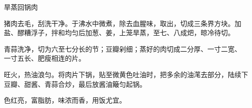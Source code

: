 %
%
%
%
%
%
%
\begin{recipe}{旱蒸回锅肉}

\ingredients


\preparation

\step 猪肉去毛，刮洗干净。于沸水中微煮，除去血腥味，取出，切成三条界方块。加
盐、醪糟浮子，拌和均匀后加葱、姜，上笼旱蒸，至七、八成𤆵，晾冷待切。

\step 青蒜洗净，切为六至七分长的节；豆瓣剁细；蒸好的肉切成二分厚、一寸二宽、
一寸五长、肥瘦相连的片。

\step 旺火，热油浪匀。将肉片下锅，贴至微黄色吐油时，把多余的油滗去部分，陆续下
豆瓣、甜酱、青蒜合炒，最后放酱油簸匀起锅。

\features

色红亮，富脂肪，味浓而香，用饭尤宜。

\end{recipe}

